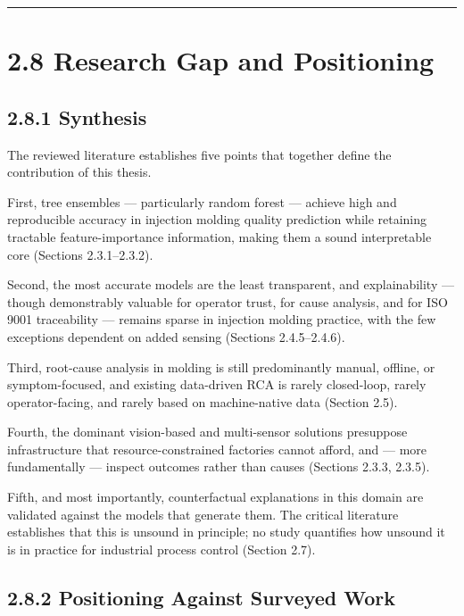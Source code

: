 \begin{center}\rule{0.5\linewidth}{0.5pt}\end{center}

\hypertarget{research-gap-and-positioning}{%
\section{2.8 Research Gap and Positioning}\label{research-gap-and-positioning}}

\hypertarget{synthesis}{%
\subsection{2.8.1 Synthesis}\label{synthesis}}

The reviewed literature establishes five points that together define the contribution of this thesis.

First, tree ensembles --- particularly random forest --- achieve high and reproducible accuracy in injection molding quality prediction while retaining tractable feature-importance information, making them a sound interpretable core (Sections 2.3.1--2.3.2).

Second, the most accurate models are the least transparent, and explainability --- though demonstrably valuable for operator trust, for cause analysis, and for ISO 9001 traceability --- remains sparse in injection molding practice, with the few exceptions dependent on added sensing (Sections 2.4.5--2.4.6).

Third, root-cause analysis in molding is still predominantly manual, offline, or symptom-focused, and existing data-driven RCA is rarely closed-loop, rarely operator-facing, and rarely based on machine-native data (Section 2.5).

Fourth, the dominant vision-based and multi-sensor solutions presuppose infrastructure that resource-constrained factories cannot afford, and --- more fundamentally --- inspect outcomes rather than causes (Sections 2.3.3, 2.3.5).

Fifth, and most importantly, counterfactual explanations in this domain are validated against the models that generate them. The critical literature establishes that this is unsound in principle; no study quantifies how unsound it is in practice for industrial process control (Section 2.7).

\hypertarget{positioning-against-surveyed-work}{%
\subsection{2.8.2 Positioning Against Surveyed Work}\label{positioning-against-surveyed-work}}

